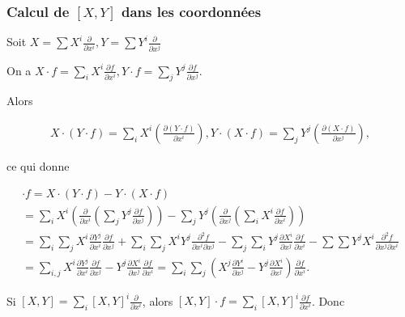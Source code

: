 \documentclass[french]{article}
\theoremstyle{definition}
\begin{document}
\subsubsection{Calcul de \([X,Y]\) dans les coordonnées} Soit \(X = \displaystyle\sum X ^{i}\displaystyle\frac{\partial  }{\partial x ^{i}}, Y =  \displaystyle\sum Y ^{i}\displaystyle\frac{\partial  }{\partial x ^{j}}\)


On a \(X \cdot f = \displaystyle \sum_{i}^{} X ^{i} \displaystyle \frac{\partial f }{\partial x ^{i}}, Y \cdot f = \displaystyle \sum_{j}^{} Y ^{j} \displaystyle \frac{\partial f }{\partial x ^{j}}\).

Alors

\begin{gather*}
  X \cdot (Y \cdot f) = \sum_{i} X ^{i} \left(\frac{\partial (Y \cdot f) }{\partial x ^{i}} \right), Y \cdot(X \cdot f) = \sum_{j} Y ^{j} \left(\frac{\partial (X \cdot f) }{\partial x ^{j}} \right),
\end{gather*}

ce qui donne

\begin{gather*}
  [X \cdot Y] \cdot f = X \cdot (Y \cdot f) - Y \cdot (X \cdot f) \\
  = \sum_{i}^{} X ^{i}\left(\frac{\partial  }{\partial x ^{i}} \left(\sum_{j} Y ^{j}\frac{\partial f }{\partial x ^{j}}  \right)\right) - \sum_{j} Y^{j}\left(\frac{\partial  }{\partial x ^{j}} \left(\sum_{i} X^{i}\frac{\partial f }{\partial x^{i}}  \right)\right) \\
  = \sum_{i}\sum_{j} X ^{i} \frac{\partial Y ^{j} }{\partial x ^{i}} \frac{\partial f }{\partial x ^{j}} + \sum_{i}\sum_{j} X ^{i} Y ^{j} \frac{\partial ^2 f }{\partial x ^{i}\partial x ^{j}} - \sum_{j}\sum_{i} Y^{j} \frac{\partial X^{i} }{\partial x ^{j}} \frac{\partial f }{\partial x^{i}} - \sum\sum Y^{j} X^{i} \frac{\partial ^2 f }{\partial x^{j} \partial x^{i}} \\
  = \sum_{i,j} X ^{i} \frac{\partial Y ^{j} }{\partial x ^{i}} \frac{\partial f }{\partial x ^{j}} - Y ^{j} \frac{\partial X ^{i} }{\partial x ^{j}} \frac{\partial f }{\partial x ^{i}}  = \sum_{i} \sum_{j} \left(X ^{j}\frac{\partial Y ^{i} }{\partial x ^{j}} - Y ^{j} \frac{\partial X ^{i} }{\partial x ^{j}} \right)  \frac{\partial f }{\partial x^{i}}.
\end{gather*}

Si \([X,Y] = \displaystyle \sum_{i} [X,Y]^{i}\displaystyle\frac{\partial  }{\partial x ^{i}}\), alors \([X,Y]\cdot f = \displaystyle \sum_{i}[X,Y]^{i}\displaystyle\frac{\partial f }{\partial x ^{i}}\). Donc
\end{document}

